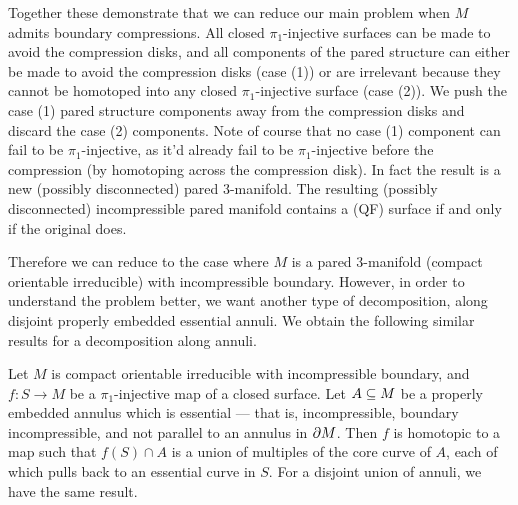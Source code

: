 Together these demonstrate that we can reduce our main problem when $M$ admits
boundary compressions. All closed $\pi_1$-injective surfaces can be made to
avoid the compression disks, and all components of the pared structure can
either be made to avoid the compression disks (case (1)) or are irrelevant
because they cannot be homotoped into any closed $\pi_1$-injective surface
(case (2)). We push the case (1) pared structure components away from the
compression disks and discard the case (2) components. Note of course that no
case (1) component can fail to be $\pi_1$-injective, as it'd already fail to be
$\pi_1$-injective before the compression (by homotoping across the compression
disk). In fact the result is a new (possibly disconnected) pared $3$-manifold.
The resulting (possibly disconnected) incompressible pared manifold contains
a (QF) surface if and only if the original does.

Therefore we can reduce to the case where $M$ is a pared $3$-manifold (compact
orientable irreducible) with incompressible boundary. However, in order to
understand the problem better, we want another type of decomposition, along
disjoint properly embedded essential annuli. We obtain the following similar
results for a decomposition along annuli.

\begin{prop}

Let $M$ is compact orientable irreducible with incompressible boundary, and $f
\colon S \to M$ be a $\pi_1$-injective map of a closed surface. Let $A \subseteq M$
be a properly embedded annulus which is essential --- that is, incompressible,
boundary incompressible, and not parallel to an annulus in $\partial M$. Then $f$ is
homotopic to a map such that $f(S) \cap A$ is a union of multiples of the core
curve of $A$, each of which pulls back to an essential curve in $S$. For
a disjoint union of annuli, we have the same result.

\end{prop}

